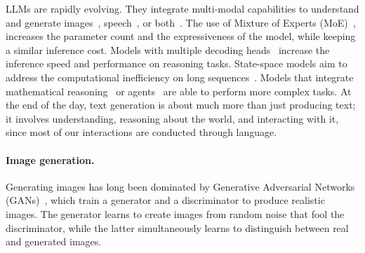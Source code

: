 LLMs are rapidly evolving.
They integrate multi-modal capabilities to understand and generate images~\citep{alayrac2022flamingo, laurenccon2024obelics, liu2024visual, team2024chameleon}, speech~\citep{rubenstein2023audiopalm, nguyen2024spirit}, or both~\citep{lu2022unified, openai2024gpt4o}. 
The use of Mixture of Experts (MoE)~\citep{shazeer2017outrageously, jiang2024mixtral}, increases the parameter count and the expressiveness of the model, while keeping a similar inference cost. 
Models with multiple decoding heads~\citep{cai2024medusa, gloeckle2024better} increase the inference speed and performance on reasoning tasks.
State-space models aim to address the computational inefficiency on long sequences~\citep{de2024griffin, gu2023mamba}.
Models that integrate mathematical reasoning~\citep{frieder2024mathematical} or agents~\citep{park2023generative, dubois2024alpacafarm} are able to perform more complex tasks.
At the end of the day, text generation is about much more than just producing text; it involves understanding, reasoning about the world, and interacting with it, since most of our interactions are conducted through language.


\paragraph{Image generation.}
Generating images has long been dominated by Generative Adversarial Networks (\Glspl*{GAN})~\citep{goodfellow2014generative, zhu2017unpaired, karras2020training, karras2019style, karras2020analyzing, sauer2022stylegan, walton2022stylenat}, which train a generator and a discriminator to produce realistic images.
The generator learns to create images from random noise that fool the discriminator, while the latter simultaneously learns to distinguish between real and generated images.


